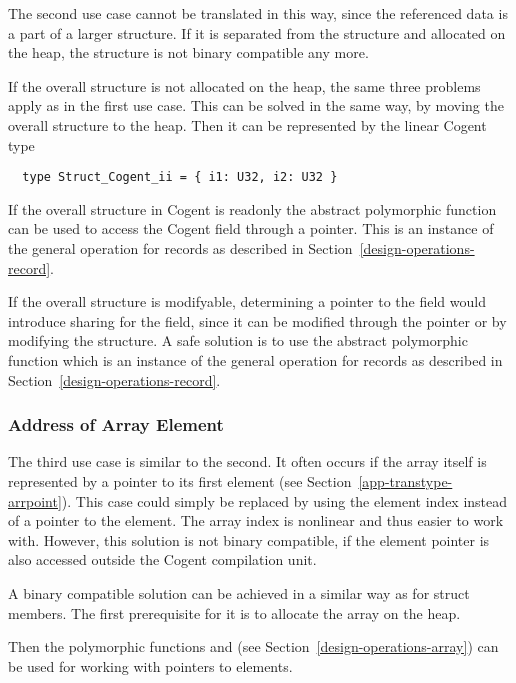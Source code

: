The second use case cannot be translated in this way, since the referenced data is a part of a larger structure.
If it is separated from the structure and allocated on the heap, the structure is not binary compatible any more.

If the overall structure is not allocated on the heap, the same three problems apply as in the first use case.
This can be solved in the same way, by moving the overall structure to the heap. Then it can be represented
by the linear Cogent type
\begin{verbatim}
  type Struct_Cogent_ii = { i1: U32, i2: U32 }
\end{verbatim}

If the overall structure in Cogent is readonly the abstract polymorphic function 
can be used to access the Cogent field through a pointer. This is an instance of the general  operation
for records as described in Section~\ref{design-operations-record}.

If the overall structure is modifyable, determining a pointer to the field would introduce sharing for the
field, since it can be modified through the pointer or by modifying the structure. A safe solution is to use 
the abstract polymorphic function  which is an instance of the general  operation
for records as described in Section~\ref{design-operations-record}.

\subsubsection{Address of Array Element}

The third use case is similar to the second. It often occurs if the array itself is represented by a pointer to its first
element (see Section~\ref{app-transtype-arrpoint}). This case could simply be replaced by using the element index instead of a 
pointer to the element. The array index is nonlinear and thus easier to work with. However, this solution is not binary
compatible, if the element pointer is also accessed outside the Cogent compilation unit.

A binary compatible solution can be achieved in a similar way as for struct members. The first prerequisite for it is
to allocate the array on the heap.

Then the polymorphic functions  and  (see Section~\ref{design-operations-array}) can be used
for working with pointers to elements.

